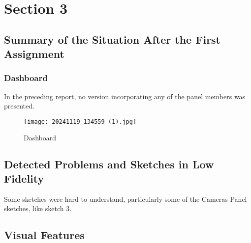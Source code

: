 \chapter{Section 3}
\section{Summary of the Situation After the First Assignment}
\subsection{Dashboard} \label{dashboard}
In the preceding report, no version incorporating any 
of the panel members was presented. 
\begin{figure}[H]
    \centerline{%
    \texttt{[image: 20241119\_134559 (1).jpg]}
    }
    \caption{Dashboard}
\end{figure}
\section{Detected Problems and Sketches in Low Fidelity}
Some sketches were hard to understand, particularly 
some of the Cameras Panel sketches, like sketch 3. 
\section{Visual Features}
